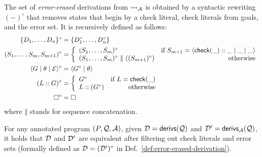 \documentclass{llncs}
\newcommand{\Q}{\ensuremath{{\cal Q}}}
\newcommand{\A}
  {\ensuremath{{\cal A}}}
\newcommand{\gd}[0]{\mid}
\newcommand{\state}[2]
  {\ensuremath{\langle #1 \gd{} #2 \rangle}}
\newcommand{\exstate}[3]
  {\ensuremath{\langle #1 \gd{} #2 \gd{} #3 \rangle}}
\newcommand{\emptyGoal}{\ensuremath{\square}}
\newcommand{\ADeps}{\ensuremath{{\cal E}}}
\newcommand{\reductionA}[2]
  {\ensuremath{#1 \leadsto_{\A} #2}}
\newcommand{\derivations}[1]
  {\ensuremath{\textsf{derivs}(#1)}}
\newcommand{\derivationsA}[1]
  {\ensuremath{\textsf{derivs}_{\A}(#1)}}
\newcommand{\checkLitLab}[1]{\ensuremath{\textsf{check}(#1)}}
\newcommand{\errorErase}[1]
  {\ensuremath{#1^{\circ}}}
\begin{document}
\begin{definition}
  \label{def:error-erased-derivation}
The set of \emph{error-erased} derivations from $\reductionA{}{}$ is
  obtained by a syntactic rewriting $\errorErase{(-)}$ that removes
  states that begin by a check literal, check literals from goals, and
  the error set. It is recursively defined as follows:
\begin{align*}
    \errorErase{\{D_1, \dots, D_n\}} &= \{\errorErase{D_1}, \dots,
    \errorErase{D_n}\} 
    \\
    \errorErase{(S_1, \dots, S_m, S_{m+1})} &= \left\{
      \begin{array}{lr}
        \errorErase{(S_1, \dots, S_m)} 
      & \text{if}~ S_{m+1} = \exstate{\checkLitLab{\_}::\_}{\_}{\_} 
      \\
        \errorErase{(S_1, \dots, S_m)} ~\Vert~
        (\errorErase{(S_{m+1})}) 
      & \text{otherwise}
      \end{array}
    \right.
    \\
    \errorErase{\exstate{G}{\theta}{\ADeps}} 
    &= \state{\errorErase{G}}{\theta} \\
    \errorErase{(L::G)} &= \left\{
      \begin{array}{lr}
        \errorErase{G} & \text{if}~ L = \checkLitLab{\_} \\
        L::(\errorErase{G}) & \text{otherwise}
      \end{array}
    \right. \\
    \errorErase{\emptyGoal} &= \emptyGoal
  \end{align*}
  \noindent where $\Vert$ stands for sequence concatenation.
\end{definition}

\begin{theorem}
  \label{th:ans-fail}
  For any annotated program $(P,\Q,\A)$, given ${\cal D} =
  \derivations{\Q}$ and ${\cal D}' = \derivationsA{\Q}$, it holds that
  ${\cal D}$ and ${\cal D}'$ are equivalent after filtering out check
  literals and error sets (formally defined as ${\cal D} =
  \errorErase{({\cal D}')}$ in Def.~\ref{def:error-erased-derivation}).
\end{theorem}
\end{document}
